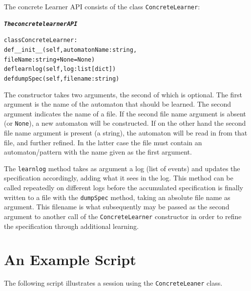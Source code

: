 \documentclass{report}
\newenvironment{code}[1] %
{
\vspace{0.5cm}
\begin{center}
\begin{Sbox}
\begin{minipage}{11cm}
\begin{alltt}
{\bf\em #1}
}
{
\end{alltt}
\end{minipage}
\end{Sbox}
\setlength{\fboxsep}{8pt}
\fbox{\TheSbox}
\end{center}
\vspace{0.5cm}
}
\begin{document}
The concrete Learner API consists of the class {\tt ConcreteLearner}:

\begin{code}{The concrete learner API}

class ConcreteLearner:
  def __init__(self,automatonName : string,
                    fileName : string+None = None)
  def learnlog(self,log : list[dict])
  def dumpSpec(self,filename : string)
\end{code}      

\noindent The constructor takes two arguments, the second of which is optional.
The first argument is the name of the automaton that should be learned. The second
argument indicates the name of a file. If the second file name argument is absent (or {\tt None}), a new automaton will be constructed. If on the other hand the second file name argument is present (a string), the automaton will be read in from that file, and further refined. In the latter case the file must contain an automaton/pattern with the name given as the first argument.

The {\tt learnlog} method takes as argument a log (list of events) and updates the specification accordingly, adding what it sees in the log. This method can be called repeatedly on different logs before the accumulated specification is finally written to a file
with the {\tt dumpSpec} method, taking an absolute file name as argument. This filename
is what subsequently may be passed as the second argument to another call
of the {\tt ConcreteLearner} constructor in order to refine the specification through additional learning.


\section{An Example Script}

The following script illustrates a session using the {\tt ConcreteLeaner} class.
\end{document}
